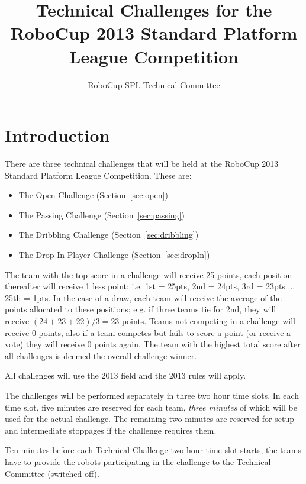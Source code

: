 \documentclass{article}
\begin{document}
\title{Technical Challenges for the RoboCup 2013 Standard Platform League Competition}

\author{RoboCup SPL Technical Committee}

\maketitle

\section{Introduction}
\label{sec:introduction}

There are three technical challenges that will be held at the RoboCup 
2013 Standard Platform League Competition. These are:

\begin{itemize}
\item The Open Challenge (Section~\ref{sec:open})
\item The Passing Challenge (Section~\ref{sec:passing})
\item The Dribbling Challenge (Section~\ref{sec:dribbling})
\item The Drop-In Player Challenge (Section~\ref{sec:dropIn})
\end{itemize}

The team with the top score in a challenge will receive 25 points, each 
position thereafter will receive 1 less point; i.e. 1st = 25pts, 2nd = 24pts, 
3rd = 23pts ... 25th = 1pts. In the case of a draw, each team will receive 
the average of the points allocated to these positions; e.g. if three teams 
tie for 2nd, they will receive $(24+23+22)/3 = 23$ points. Teams not competing 
in a challenge will receive 0 points, also if a team competes but fails to 
score a point (or receive a vote) they will receive 0 points again. The team 
with the highest total score after all challenges is deemed the overall 
challenge winner.

All challenges will use the 2013 field and the 2013 rules will apply.

The challenges will be performed separately in three two hour time slots. 
In each time slot, five minutes are reserved for each team, \emph{three minutes} 
of which will be used for the actual challenge. The remaining two minutes are 
reserved for setup and intermediate stoppages if the challenge requires them.

Ten minutes before each Technical Challenge two hour time slot starts, the teams 
have to provide the robots participating in the challenge to the Technical Committee 
(switched off).
\end{document}
